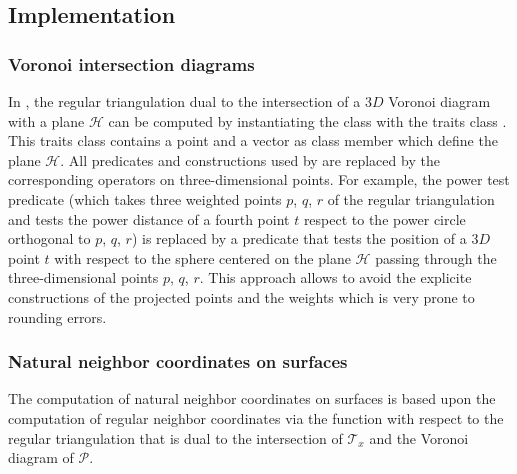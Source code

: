\subsection{Implementation}
\subsubsection{Voronoi intersection diagrams}


In \cgal, the regular triangulation dual to the intersection of a $3D$
Voronoi diagram with a plane $\mathcal{H}$ can be computed by
instantiating the  class with
the traits class . This traits
class contains a point and a vector as class member which define the
plane $\mathcal{H}$. All predicates and constructions used by  are replaced by the corresponding operators on
three-dimensional points. For example, the power test predicate (which
takes three weighted points $p$, $q$, $r$ of the regular triangulation
and tests the power distance of a fourth point $t$ respect to the
power circle orthogonal to $p$, $q$, $r$) is replaced by a
 predicate that tests the
position of a $3D$ point $t$ with respect to the sphere centered on
the plane $\mathcal{H}$ passing through the three-dimensional points
$p$, $q$, $r$.  This approach allows to avoid the explicite
constructions of the projected points and the weights which is very
prone to rounding errors.

\subsubsection{Natural neighbor coordinates on surfaces}

The computation of natural neighbor coordinates on surfaces is based
upon the computation of regular neighbor coordinates via the function
 with respect to the regular
triangulation that is dual to the intersection of $\mathcal{T}_x$ and
the Voronoi diagram of $\mathcal{P}$.

